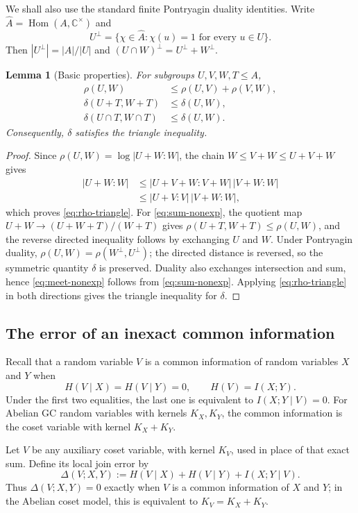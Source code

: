 \documentclass[journal]{IEEEtran}
\newtheorem{lemma}[theorem]{Lemma}
\begin{document}
We shall also use the standard finite Pontryagin duality identities.  Write
$\widehat A=\operatorname{Hom}(A,\mathbb C^\times)$ and
\[
 U^\perp=\{\chi\in\widehat A:\chi(u)=1\text{ for every }u\in U\}.
\]
Then $|U^\perp|=|A|/|U|$ and
$(U\cap W)^\perp=U^\perp+W^\perp$.

\begin{lemma}[Basic properties]\label{lem:distance}
For subgroups $U,V,W,T\le A$,
\begin{align}
 \rho(U,W)&\le \rho(U,V)+\rho(V,W),\label{eq:rho-triangle}\\
 \delta(U+T,W+T)&\le \delta(U,W),\label{eq:sum-nonexp}\\
 \delta(U\cap T,W\cap T)&\le \delta(U,W).\label{eq:meet-nonexp}
\end{align}
Consequently, $\delta$ satisfies the triangle inequality.
\end{lemma}
\begin{proof}
Since $\rho(U,W)=\log|U+W:W|$, the chain
$W\le V+W\le U+V+W$ gives
\begin{align*}
 |U+W:W|
 &\le |U+V+W:V+W|\,|V+W:W|\\
 &\le |U+V:V|\,|V+W:W|,
\end{align*}
which proves \eqref{eq:rho-triangle}.  For \eqref{eq:sum-nonexp}, the quotient
map $U+W\to(U+W+T)/(W+T)$ gives
$\rho(U+T,W+T)\le\rho(U,W)$, and the reverse directed inequality follows by
exchanging $U$ and $W$.  Under Pontryagin duality,
$\rho(U,W)=\rho(W^\perp,U^\perp)$; the directed distance is reversed, so the
symmetric quantity $\delta$ is preserved.  Duality also exchanges intersection
and sum, hence \eqref{eq:meet-nonexp} follows from \eqref{eq:sum-nonexp}.
Applying \eqref{eq:rho-triangle} in both directions gives the triangle
inequality for $\delta$.
\end{proof}

\subsection{The error of an inexact common information}\label{sec:join-error}
Recall that a random variable $V$ is a common information of random variables
$X$ and $Y$ when
\[
 H(V\mid X)=H(V\mid Y)=0,
 \qquad H(V)=I(X;Y).
\]
Under the first two equalities, the last one is equivalent to
$I(X;Y\mid V)=0$.  For Abelian GC random variables with kernels $K_X,K_Y$, the
common information is the coset variable with kernel $K_X+K_Y$.

Let $V$ be any auxiliary coset variable, with kernel $K_V$, used in place of
that exact sum.  Define its local join error by
\begin{equation}\label{eq:defect}
 \Delta(V;X,Y)
 :=H(V\mid X)+H(V\mid Y)+I(X;Y\mid V).
\end{equation}
Thus $\Delta(V;X,Y)=0$ exactly when $V$ is a common information of $X$ and
$Y$; in the Abelian coset model, this is equivalent to $K_V=K_X+K_Y$.
\end{document}
